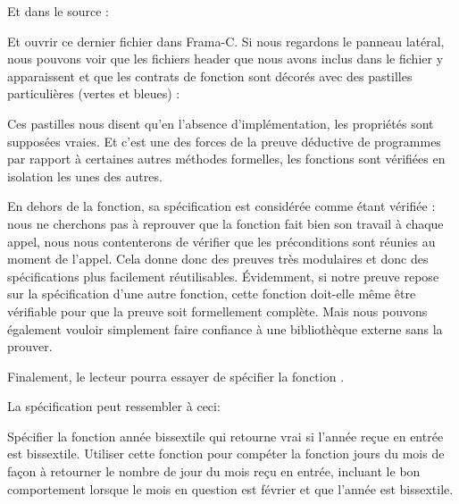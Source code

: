 Et dans le source :






Et ouvrir ce dernier fichier dans Frama-C. Si nous regardons le panneau latéral,
nous pouvons voir que les fichiers header que nous avons inclus dans le fichier
 y apparaissent et que les contrats de fonction sont décorés avec des
pastilles particulières (vertes et bleues) :





Ces pastilles nous disent qu'en l'absence d'implémentation, les propriétés sont
supposées vraies. Et c'est une des forces de la preuve déductive de programmes
par rapport à certaines autres méthodes formelles, les fonctions sont vérifiées
en isolation les unes des autres.



En dehors de la fonction, sa spécification est considérée comme étant
vérifiée : nous ne cherchons pas à reprouver que la fonction fait bien son travail
à chaque appel, nous nous contenterons de vérifier que les préconditions sont
réunies au moment de l'appel. Cela donne donc des preuves très modulaires et donc
des spécifications plus facilement réutilisables. Évidemment, si notre preuve
repose sur la spécification d'une autre fonction, cette fonction doit-elle même
être vérifiable pour que la preuve soit formellement complète. Mais nous pouvons
également vouloir simplement faire confiance à une bibliothèque externe sans la
prouver.



Finalement, le lecteur pourra essayer de spécifier la fonction .



La spécification peut ressembler à ceci:









\label{l4:contract-modularity-ex-days-of-month}


Spécifier la fonction année bissextile qui retourne vrai si l'année reçue
en entrée est bissextile. Utiliser cette fonction pour compéter la fonction
jours du mois de façon à retourner le nombre de jour du mois reçu en entrée,
incluant le bon comportement lorsque le mois en question est février et que
l'année est bissextile.



